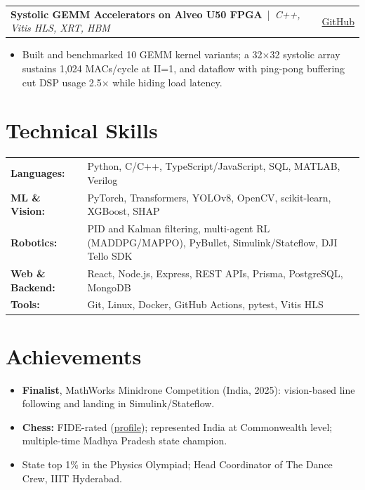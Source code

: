 \documentclass[letterpaper,10pt]{article}
\newcommand{\project}[3]{%
  \begin{tabularx}{\textwidth}{X r}
    \textbf{#1} \,|\, \textit{\small #2} & \small\href{#3}{GitHub} \\
  \end{tabularx}\vspace{-3pt}}
\begin{document}
\project{Systolic GEMM Accelerators on Alveo U50 FPGA}{C++, Vitis HLS, XRT, HBM}{https://github.com/pg1590/HLS-GEMM-Accelerators-on-AMD-Xilinx-FPGA}
\begin{itemize}
  \item Built and benchmarked 10 GEMM kernel variants; a 32$\times$32 systolic array sustains 1,024 MACs/cycle at II=1, and dataflow with ping-pong buffering cut DSP usage 2.5$\times$ while hiding load latency.
\end{itemize}

\section{Technical Skills}
\begin{tabularx}{\textwidth}{@{}l X@{}}
  \textbf{Languages:}\; & Python, C/C++, TypeScript/JavaScript, SQL, MATLAB, Verilog \\
  \textbf{ML \& Vision:}\; & PyTorch, Transformers, YOLOv8, OpenCV, scikit-learn, XGBoost, SHAP \\
  \textbf{Robotics:}\; & PID and Kalman filtering, multi-agent RL (MADDPG/MAPPO), PyBullet, Simulink/Stateflow, DJI Tello SDK \\
  \textbf{Web \& Backend:}\; & React, Node.js, Express, REST APIs, Prisma, PostgreSQL, MongoDB \\
  \textbf{Tools:}\; & Git, Linux, Docker, GitHub Actions, pytest, Vitis HLS \\
\end{tabularx}

\section{Achievements}
\begin{itemize}
  \item \textbf{Finalist}, MathWorks Minidrone Competition (India, 2025): vision-based line following and landing in Simulink/Stateflow.
  \item \textbf{Chess:} FIDE-rated (\href{https://ratings.fide.com/profile/35062239}{\underline{profile}}); represented India at Commonwealth level; multiple-time Madhya Pradesh state champion.
  \item State top 1\% in the Physics Olympiad; Head Coordinator of The Dance Crew, IIIT Hyderabad.
\end{itemize}
\end{document}
